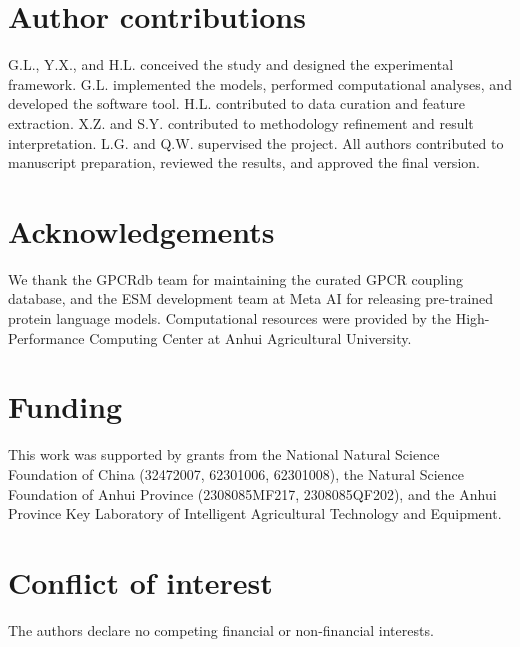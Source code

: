 \documentclass[11pt,a4paper]{article}
\begin{document}
\section*{Author contributions}

G.L., Y.X., and H.L. conceived the study and designed the experimental framework. G.L. implemented the models, performed computational analyses, and developed the software tool. H.L. contributed to data curation and feature extraction. X.Z. and S.Y. contributed to methodology refinement and result interpretation. L.G. and Q.W. supervised the project. All authors contributed to manuscript preparation, reviewed the results, and approved the final version.

\section*{Acknowledgements}

We thank the GPCRdb team for maintaining the curated GPCR coupling database, and the ESM development team at Meta AI for releasing pre-trained protein language models. Computational resources were provided by the High-Performance Computing Center at Anhui Agricultural University.

\section*{Funding}

This work was supported by grants from the National Natural Science Foundation of China (32472007, 62301006, 62301008), the Natural Science Foundation of Anhui Province (2308085MF217, 2308085QF202), and the Anhui Province Key Laboratory of Intelligent Agricultural Technology and Equipment.

\section*{Conflict of interest}

The authors declare no competing financial or non-financial interests.



\end{document}
